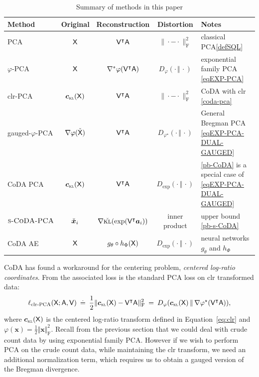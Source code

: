 \documentclass{article}
\begin{document}
\begin{table}[t]
  \caption{Summary of methods in this paper}
  \begin{tabular}{l||c|c|c||l}
    \toprule
    Method&Original&Reconstruction&Distortion&Notes\\
    \hline
    PCA&$\mathsf{X}$ &$\mathsf{V}^\intercal \mathsf{A}$&$\|\cdot - \cdot\|_\mathrm{F}^2$
    &classical PCA\eqref{defSQL}\\
    $\varphi$-PCA & $\mathsf{X}$& $\nabla^*\varphi(\mathsf{V}^\intercal \mathsf{A})$ & $D_\varphi(\cdot\,\Vert\,\cdot)$
    & exponential family PCA \eqref{eqEXP-PCA}\\
    clr-PCA& $\clrlog(\X)$ &$\mathsf{V}^\intercal \mathsf{A}$&$\|\cdot - \cdot \|_\mathrm{F}^2$
    & CoDA with clr \eqref{coda-pca}\\
    gauged-$\varphi$-PCA&$\nabla\varphi(\check{\mathsf{X}})$&$\mathsf{V}^\intercal \mathsf{A}$ &$D_{\varphi^\star}(\cdot\,\Vert\,\cdot)$
    &General Bregman PCA \eqref{eqEXP-PCA-DUAL-GAUGED}\\
    CoDA PCA&$\clrlog({\X})$&$\mathsf{V}^\intercal \mathsf{A}$&$D_{\exp}(\cdot\,\Vert\,\cdot)$
    &\eqref{pb-CoDA} is a special case of  \eqref{eqEXP-PCA-DUAL-GAUGED}\\
    $\surrogateCoDAPCA$&$\check{\bm{x}}_i$&$\nabla \check{{\textsc{kl}}}(\exp(\mathsf{V}^\intercal \bm{a}_i))$&
    inner product&upper bound \eqref{pb-s-CoDA}\\
    CoDA AE&$\mathsf{X}$&$g_\theta \circ h_\Phi(\mathsf{X})$&$D_{\exp}(\cdot\,\Vert\,\cdot)$
    &neural networks $g_\theta$ and $h_\Phi$\\
    \bottomrule
  \end{tabular}
  \label{tab:summary-of-methods}
\end{table}

CoDA has
found a workaround for the centering problem, \textit{centered log-ratio
 coordinates}.
From \cite[Def. 4.6, Chap. 8]{aTSB} the associated loss is
the standard PCA loss on clr transformed data:
\begin{equation}
\ell_{\mathrm{clr\text{-}PCA}}(\X; \A,\V)
\:\defeq\:\frac{1}{2}\|\clrlog(\X) -\V^\top \A\|_\mathrm{F}^2\label{coda-pca}
\:=\: D_\varphi(\clrlog(\X)\,\Vert\,\nabla\varphi^\star(\V^\top \A)),
\end{equation}
where $\clrlog(\X)$ is the centered log-ratio transform defined in
Equation~\eqref{eq:clr} and $\varphi(\bm{x})=\frac{1}{2}\Vert\bm{x}\Vert_{\mathrm{F}}^2$.
Recall from the previous section that we could deal with crude count data by using
exponential family PCA.
However if we wish to perform PCA on the crude count data, while maintaining the clr transform,
we need an additional normalization
term, which requires us to obtain a gauged version of the Bregman divergence.
\end{document}
